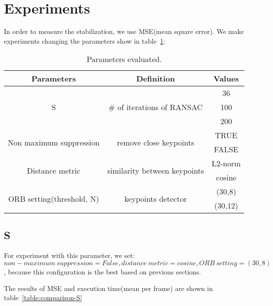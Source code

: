 \section{Experiments}

In order to measure the stabilization, we use MSE(mean square error). We make experiments changing the parameters show in table~\ref{table:setting-parameters}:

\begin{table}[]
\centering
\begin{tabular}{|c|c|c|}
\hline
\textbf{Parameters} & \textbf{Definition} & \textbf{Values} \\ \hline
\multirow{3}{*}{S} & \multirow{3}{*}{\# of iterations of RANSAC} & 36 \\ \cline{3-3} 
 &  & 100 \\ \cline{3-3} 
 &  & 200 \\ \hline
\multirow{2}{*}{Non maximum suppression} & \multirow{2}{*}{remove close keypoints} & TRUE \\ \cline{3-3} 
 &  & FALSE \\ \hline
\multirow{2}{*}{Distance metric} & \multirow{2}{*}{similarity between keypoints} & L2-norm \\ \cline{3-3} 
 &  & cosine \\ \hline
\multirow{2}{*}{ORB setting(threshold, N)} & \multirow{2}{*}{keypoints detector} & (30,8) \\ \cline{3-3} 
 &  & (30,12) \\ \hline
\end{tabular}
\caption{Parameters evaluated.}
\label{table:setting-parameters}
\end{table}
    

\subsection{S}

For experiment with this parameter, we set: $non-maximum~suppression=False, distance~metric=cosine, ORB~ setting = (30,8)$, because this configuration is the best based on previous sections.

The results of MSE and execution time(mean per frame) are shown in table~\ref{table:comparison-S}

